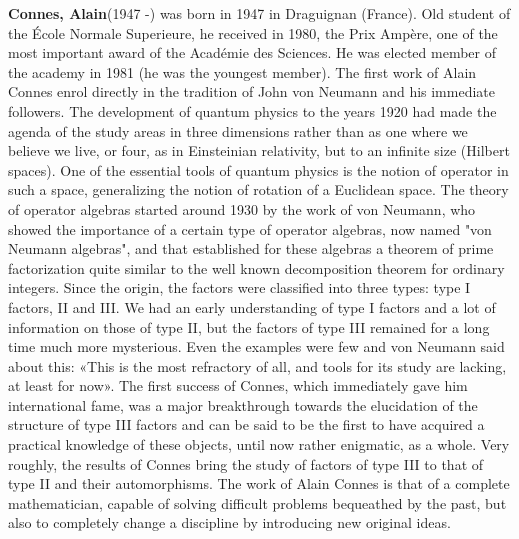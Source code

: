 \textbf{Connes, Alain}(1947 -) was born in 1947 in Draguignan (France). Old student of the École Normale Superieure, he received in 1980, the Prix Ampère, one of the most important award of the Académie des Sciences. He was elected member of the academy in 1981 (he was the youngest member). The first work of Alain Connes enrol directly in the tradition of John von Neumann and his immediate followers. The development of quantum physics to the years 1920 had made the agenda of the study areas in three dimensions rather than as one where we believe we live, or four, as in Einsteinian relativity, but to an infinite size (Hilbert spaces). One of the essential tools of quantum physics is the notion of operator in such a space, generalizing the notion of rotation of a Euclidean space. The theory of operator algebras started around 1930 by the work of von Neumann, who showed the importance of a certain type of operator algebras, now named "von Neumann algebras", and that established for these algebras a theorem of prime factorization quite similar to the well known decomposition theorem for ordinary integers. Since the origin, the factors were classified into three types: type I factors, II and III. We had an early understanding of type I factors and a lot of information on those of type II, but the factors of type III remained for a long time much more mysterious. Even the examples were few and von Neumann said about this: «This is the most refractory of all, and tools for its study are lacking, at least for now». The first success of Connes, which immediately gave him international fame, was a major breakthrough towards the elucidation of the structure of type III factors and can be said to be the first to have acquired a practical knowledge of these objects, until now rather enigmatic, as a whole. Very roughly, the results of Connes bring the study of factors of type III to that of type II and their automorphisms. The work of Alain Connes is that of a complete mathematician, capable of solving difficult problems bequeathed by the past, but also to completely change a discipline by introducing new original ideas.

